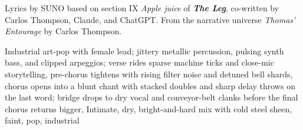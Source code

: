 
\begin{notes}
Lyrics by SUNO based on section IX \emph{Apple juice} of \emph{\bfseries The Leg}, %
co-written by Carlos Thompson, Claude, and ChatGPT. %
From the narrative universe \emph{Thomas’ Entourage} by Carlos Thompson.
\end{notes}
\begin{style}
Industrial art-pop with female lead; jittery metallic percussion, pulsing synth bass, and clipped arpeggios; verse rides sparse machine ticks and close-mic storytelling, pre-chorus tightens with rising filter noise and detuned bell shards, chorus opens into a blunt chant with stacked doubles and sharp delay throws on the last word; bridge drops to dry vocal and conveyor-belt clanks before the final chorus returns bigger, Intimate, dry, bright-and-hard mix with cold steel sheen, faint, pop, industrial
\end{style}
